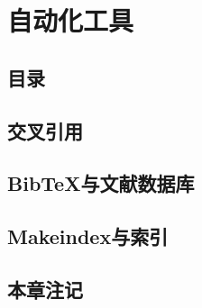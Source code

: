 
\chapter{自动化工具}

\section{目录}

\section{交叉引用}

\section{BibTeX与文献数据库}

\section{Makeindex与索引}

\section*{本章注记}